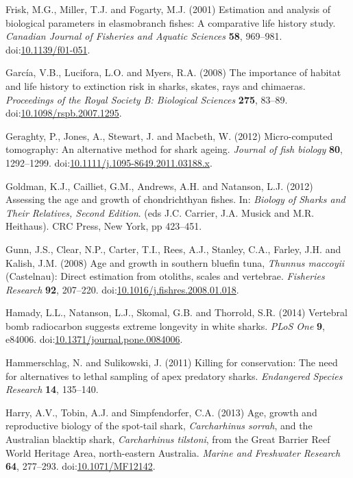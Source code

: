\documentclass[]{article}
\begin{document}
\hypertarget{ref-frisk_estimation_2001}{}
Frisk, M.G., Miller, T.J. and Fogarty, M.J. (2001) Estimation and
analysis of biological parameters in elasmobranch fishes: A comparative
life history study. \emph{Canadian Journal of Fisheries and Aquatic
Sciences} \textbf{58}, 969--981.
doi:\href{https://doi.org/10.1139/f01-051}{10.1139/f01-051}.

\hypertarget{ref-garcia_importance_2008}{}
García, V.B., Lucifora, L.O. and Myers, R.A. (2008) The importance of
habitat and life history to extinction risk in sharks, skates, rays and
chimaeras. \emph{Proceedings of the Royal Society B: Biological
Sciences} \textbf{275}, 83--89.
doi:\href{https://doi.org/10.1098/rspb.2007.1295}{10.1098/rspb.2007.1295}.

\hypertarget{ref-geraghty_micro-computed_2012}{}
Geraghty, P., Jones, A., Stewart, J. and Macbeth, W. (2012)
Micro-computed tomography: An alternative method for shark ageing.
\emph{Journal of fish biology} \textbf{80}, 1292--1299.
doi:\href{https://doi.org/10.1111/j.1095-8649.2011.03188.x}{10.1111/j.1095-8649.2011.03188.x}.

\hypertarget{ref-goldman_assessing_2012}{}
Goldman, K.J., Cailliet, G.M., Andrews, A.H. and Natanson, L.J. (2012)
Assessing the age and growth of chondrichthyan fishes. In: \emph{Biology
of Sharks and Their Relatives, Second Edition}. (eds J.C. Carrier, J.A.
Musick and M.R. Heithaus). CRC Press, New York, pp 423--451.

\hypertarget{ref-gunn_age_2008}{}
Gunn, J.S., Clear, N.P., Carter, T.I., Rees, A.J., Stanley, C.A.,
Farley, J.H. and Kalish, J.M. (2008) Age and growth in southern bluefin
tuna, \emph{Thunnus maccoyii} (Castelnau): Direct estimation from
otoliths, scales and vertebrae. \emph{Fisheries Research} \textbf{92},
207--220.
doi:\href{https://doi.org/10.1016/j.fishres.2008.01.018}{10.1016/j.fishres.2008.01.018}.

\hypertarget{ref-hamady_vertebral_2014}{}
Hamady, L.L., Natanson, L.J., Skomal, G.B. and Thorrold, S.R. (2014)
Vertebral bomb radiocarbon suggests extreme longevity in white sharks.
\emph{PLoS One} \textbf{9}, e84006.
doi:\href{https://doi.org/10.1371/journal.pone.0084006}{10.1371/journal.pone.0084006}.

\hypertarget{ref-hammerschlag_killing_2011}{}
Hammerschlag, N. and Sulikowski, J. (2011) Killing for conservation: The
need for alternatives to lethal sampling of apex predatory sharks.
\emph{Endangered Species Research} \textbf{14}, 135--140.

\hypertarget{ref-harry_age_2013}{}
Harry, A.V., Tobin, A.J. and Simpfendorfer, C.A. (2013) Age, growth and
reproductive biology of the spot-tail shark, \emph{Carcharhinus sorrah},
and the Australian blacktip shark, \emph{Carcharhinus tilstoni}, from
the Great Barrier Reef World Heritage Area, north-eastern Australia.
\emph{Marine and Freshwater Research} \textbf{64}, 277--293.
doi:\href{https://doi.org/10.1071/MF12142}{10.1071/MF12142}.
\end{document}
